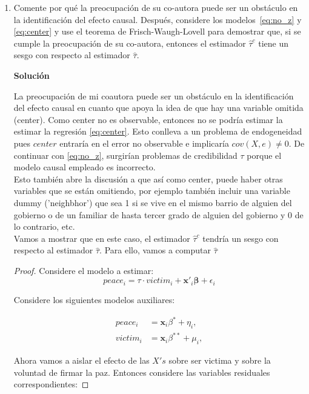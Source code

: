 \documentclass[a4paper, answers, addpoints, 11pt]{exam}
\newenvironment{solucion}{%
  \begin{mdframed}[
    backgroundcolor=blue!5,    %
    linecolor=blue!50,          %
    linewidth=2pt,              %
    leftmargin=10pt,            %
    rightmargin=8pt,           %
    topline=true,              %
    bottomline=true,            %
    roundcorner=10pt,           %
    innerleftmargin=10pt,       %
    innerrightmargin=10pt,      %
    innerbottommargin=10pt,     %
    innertopmargin=10pt         %
  ]%
  \begin{tcolorbox}[colframe=blue!50!black, colback=blue!50, coltitle=white, sharp corners=all, boxrule=1mm, width=\textwidth, halign=left, valign=center, top=0mm, bottom=0mm, left=0mm, right=0mm] \textbf{Solución} \end{tcolorbox} }{\end{mdframed}}
\begin{document}
\begin{enumerate} [resume]
    \item Comente por qué la preocupación de su co-autora puede ser un obstáculo en la identificación del efecto causal. Después, considere los modelos~\eqref{eq:no_z} y \eqref{eq:center} y use el teorema de Frisch-Waugh-Lovell para demostrar que, si se cumple la preocupación de su co-autora, entonces el estimador $\hat\tau^c$ tiene un sesgo con respecto al estimador $\hat\tau$.

  \begin{solucion}
        
        La preocupación de mi coautora puede ser un obstáculo en la identificación del efecto causal en cuanto que apoya la idea de que hay una variable omitida (center). Como center no es observable, entonces no se podría estimar la  estimar la regresión \eqref{eq:center}. Esto conlleva a un problema de endogeneidad pues $center$ entraría en el error no observable e implicaría $cov (X, e)\neq 0$. De continuar con \ref{eq:no_z}, surgirían problemas de credibilidad $\tau$ porque el modelo causal empleado es incorrecto. \\
        
        Esto también abre la discusión a que así como center, puede haber otras variables que se están omitiendo, por ejemplo también incluir una variable dummy ('neighbhor') que sea 1 si se vive en el mismo barrio de alguien del gobierno o de un familiar de hasta tercer grado de alguien del gobierno y 0 de lo contrario, etc.\\
        
    Vamos a mostrar que en este caso, el estimador  $\hat\tau^c$ tendría un sesgo con respecto al estimador $\hat\tau$. Para ello, vamos a computar $\hat\tau$
    \begin{proof}
Considere el modelo a estimar:
\begin{equation*} 
    peace_i = \tau \cdot victim_i + \textbf{x}'_i\boldsymbol\beta + \epsilon_i
\end{equation*}

Considere los siguientes modelos auxiliares:

\begin{align*}
    peace_i &= \textbf{x}_i \beta^{*} + \eta_i, \\
    victim_i &= \textbf{x}_i\beta^{**} + \mu_i,
\end{align*}

\noindent Ahora vamos a aislar el efecto de las $X's$ sobre ser victima y sobre la voluntad de firmar la paz. Entonces considere las variables residuales correspondientes:


\end{proof}
\end{solucion}
\end{enumerate}
\end{document}
